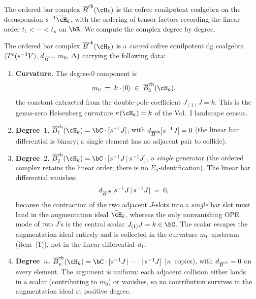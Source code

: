 The ordered bar complex $\Barch(\cH_k)$ is the cofree conilpotent
coalgebra on the desuspension $\susp^{-1}\overline{\cH}_k$, with
the ordering of tensor factors recording the linear order
$t_1 < \cdots < t_n$ on $\bR$. We compute the complex degree by
degree.

\begin{theorem}
\label{thm:heisenberg-ordered-bar}
The ordered bar complex $\Barch(\cH_k)$ is a \emph{curved}
cofree conilpotent dg coalgebra
$(T^c(s^{-1}V),\, d_{\overline{B}^{\mathrm{ch}}},\, m_0,\, \Delta)$
carrying the following data:
\begin{enumerate}[label=\textup{(\arabic*)}]
\item \textbf{Curvature.}\enspace
The degree-$0$ component is
\begin{equation}\label{eq:heisenberg-curvature-ordered}
m_0 \;=\; k\cdot\lvert 0\rangle
\;\in\;\Barch_0(\cH_k),
\end{equation}
the constant extracted from the double-pole coefficient
$J_{(1)}J=k$. This is the genus-zero Heisenberg curvature
$\kappa(\cH_k)=k$ of the Vol.~I landscape census.

\item \textbf{Degree~$1$.}\enspace
$\Barch_1(\cH_k) = \bC\cdot[\susp^{-1}J]$, with
$d_{\overline{B}^{\mathrm{ch}}}[s^{-1}J] = 0$
\textup{(}the linear bar differential is binary;
a single element has no adjacent pair to collide\textup{)}.

\item \textbf{Degree~$2$.}\enspace
$\Barch_2(\cH_k) = \bC\cdot[\susp^{-1}J \,|\, \susp^{-1}J]$,
a \emph{single} generator
\textup{(}the ordered complex retains the linear order;
there is no $\Sigma_2$-identification\textup{)}.
The linear bar differential vanishes:
\begin{equation}\label{eq:heisenberg-d2-ordered}
d_{\overline{B}^{\mathrm{ch}}}[s^{-1}J \,|\, s^{-1}J]
\;=\; 0,
\end{equation}
because the contraction of the two adjacent $J$-slots into a
\emph{single} bar slot must land in the augmentation ideal
$\bar\cH_k$, whereas the only nonvanishing OPE mode of two
$J$'s is the central scalar $J_{(1)}J=k\in\bC$. The scalar
escapes the augmentation ideal entirely and is collected in
the curvature $m_0$ upstream \textup{(}item~\textup{(1)}\textup{)},
not in the linear differential~$d_1$.

\item \textbf{Degree~$n$.}\enspace
$\Barch_n(\cH_k) = \bC\cdot[\susp^{-1}J \,|\,
\cdots \,|\, \susp^{-1}J]$ \textup{(}$n$~copies\textup{)},
with $d_{\overline{B}^{\mathrm{ch}}} = 0$ on every element. The argument is
uniform: each adjacent collision either lands in a scalar
\textup{(}contributing to $m_0$\textup{)} or vanishes, so no
contribution survives in the augmentation ideal at positive
degree.


\end{enumerate}
\end{theorem}
